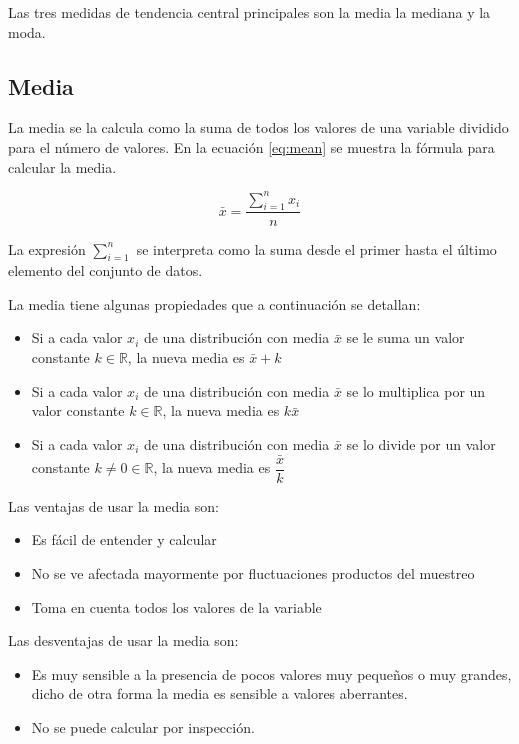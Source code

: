 \documentclass[]{book}
\providecommand{\tightlist}{%
  \setlength{\itemsep}{0pt}\setlength{\parskip}{0pt}}
\begin{document}
Las tres medidas de tendencia central principales son la media la mediana y la moda.

\hypertarget{media}{%
\subsection{Media}\label{media}}

La media se la calcula como la suma de todos los valores de una variable dividido para el número de valores. En la ecuación \eqref{eq:mean} se muestra la fórmula para calcular la media.

\begin{equation} 
  \bar{x} = \dfrac{\sum_{i=1}^{n}x_i}{n}
  \label{eq:mean}
\end{equation}

La expresión \(\sum_{i=1}^{n}\) se interpreta como la suma desde el primer hasta el último elemento del conjunto de datos.

La media tiene algunas propiedades que a continuación se detallan:

\begin{itemize}
\tightlist
\item
  Si a cada valor \(x_i\) de una distribución con media \(\bar{x}\) se le suma un valor constante \(k \in \mathbb{R}\), la nueva media es \(\bar{x}+k\)
\item
  Si a cada valor \(x_i\) de una distribución con media \(\bar{x}\) se lo multiplica por un valor constante \(k \in \mathbb{R}\), la nueva media es \(k\bar{x}\)
\item
  Si a cada valor \(x_i\) de una distribución con media \(\bar{x}\) se lo divide por un valor constante \(k \neq 0 \in \mathbb{R}\), la nueva media es \(\dfrac{\bar{x}}{k}\)
\end{itemize}

Las ventajas de usar la media son:

\begin{itemize}
\tightlist
\item
  Es fácil de entender y calcular
\item
  No se ve afectada mayormente por fluctuaciones productos del muestreo
\item
  Toma en cuenta todos los valores de la variable
\end{itemize}

Las desventajas de usar la media son:

\begin{itemize}
\tightlist
\item
  Es muy sensible a la presencia de pocos valores muy pequeños o muy grandes, dicho de otra forma la media es sensible a valores aberrantes.
\item
  No se puede calcular por inspección.
\end{itemize}
\end{document}
